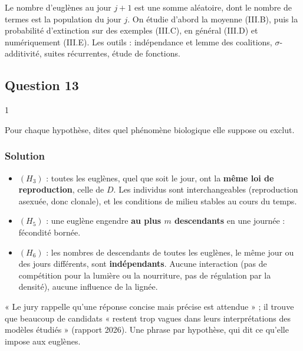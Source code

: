 \documentclass[11pt,a4paper]{article}
\providecommand{\tightlist}{\setlength{\itemsep}{0pt}\setlength{\parskip}{0pt}}
\begin{document}
Le nombre d'euglènes au jour \(j+1\) est une somme aléatoire, dont le nombre de termes est la population du jour \(j\). On étudie d'abord la moyenne (III.B), puis la probabilité d'extinction sur des exemples (III.C), en général (III.D) et numériquement (III.E). Les outils : indépendance et lemme des coalitions, \(\sigma\)-additivité, suites récurrentes, étude de fonctions.

\hypertarget{question-13}{%
\subsection{Question 13}\label{question-13}}

\begin{indication}{1}

Pour chaque hypothèse, dites quel phénomène biologique elle suppose ou exclut.

\end{indication}

\hypertarget{solution-26}{%
\subsubsection{Solution}\label{solution-26}}

\begin{itemize}
\tightlist
\item
  \((H_3)\) : toutes les euglènes, quel que soit le jour, ont la \textbf{même loi de reproduction}, celle de \(D\). Les individus sont interchangeables (reproduction asexuée, donc clonale), et les conditions de milieu stables au cours du temps.
\item
  \((H_5)\) : une euglène engendre \textbf{au plus \(m\) descendants} en une journée : fécondité bornée.
\item
  \((H_6)\) : les nombres de descendants de toutes les euglènes, le même jour ou des jours différents, sont \textbf{indépendants}. Aucune interaction (pas de compétition pour la lumière ou la nourriture, pas de régulation par la densité), aucune influence de la lignée.
\end{itemize}

\begin{jury}

« Le jury rappelle qu'une réponse concise mais précise est attendue » ; il trouve que beaucoup de candidats « restent trop vagues dans leurs interprétations des modèles étudiés » (rapport 2026). Une phrase par hypothèse, qui dit ce qu'elle impose aux euglènes.

\end{jury}
\end{document}

